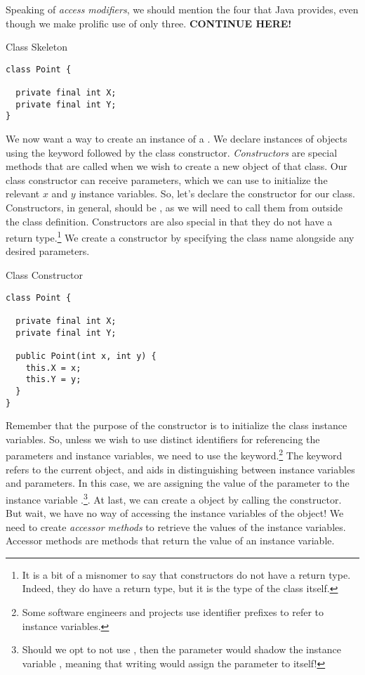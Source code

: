 Speaking of \textit{access modifiers}, we should mention the four that Java provides, even though we make prolific use of only three. \textbf{CONTINUE HERE!}

\begin{cl}{ Class Skeleton}
\begin{lstlisting}[language=MyJava]
class Point {

  private final int X;
  private final int Y;
}
\end{lstlisting}
\end{cl}
We now want a way to create an instance of a . We declare instances of objects using the  keyword followed by the class constructor. \textit{Constructors} are special methods that are called when we wish to create a new object of that class. Our  class constructor can receive parameters, which we can use to initialize the relevant $x$ and $y$ instance variables. So, let's declare the constructor for our  class. Constructors, in general, should be , as we will need to call them from outside the class definition. Constructors are also special in that they do not have a return type.\footnote{It is a bit of a misnomer to say that constructors do not have a return type. Indeed, they do have a return type, but it is the type of the class itself.} We create a constructor by specifying the class name alongside any desired parameters.

\begin{cl}{ Class Constructor}
\begin{lstlisting}[language=MyJava]
class Point {
  
  private final int X;
  private final int Y;
  
  public Point(int x, int y) {
    this.X = x;
    this.Y = y;
  }
}
\end{lstlisting}
\end{cl}
Remember that the purpose of the constructor is to initialize the class instance variables. So, unless we wish to use distinct identifiers for referencing the parameters and instance variables, we need to use the  keyword.\footnote{Some software engineers and projects use identifier prefixes to refer to instance variables.} The  keyword refers to the current object, and aids in distinguishing between instance variables and parameters. In this case, we are assigning the value of the parameter  to the instance variable .\footnote{Should we opt to not use , then the parameter  would shadow the instance variable , meaning that writing  would assign the parameter to itself!}. At last, we can create a  object by calling the constructor. But wait, we have no way of accessing the instance variables of the  object! We need to create \textit{accessor methods} to retrieve the values of the instance variables. Accessor methods are  methods that return the value of an instance variable. 

